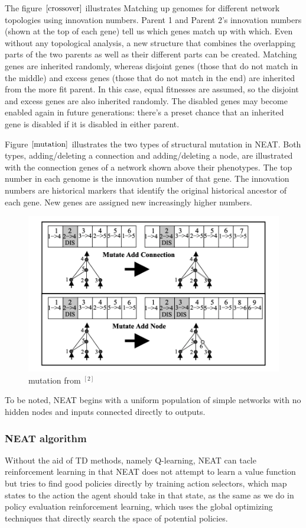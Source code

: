 \documentclass{article}
\begin{document}
The figure $\ref{crossover}$ illustrates Matching up genomes for different network topologies using innovation numbers. 
 Parent 1 and Parent 2's innovation numbers (shown at the top of each gene) tell us which genes match up with which. Even without any topological analysis,
 a new structure that combines the overlapping parts of the two parents as well as their different parts can be created. Matching genes are inherited randomly, whereas disjoint genes (those that do not match in the middle)
  and excess genes (those that do not match in the end) are inherited from the more fit parent. In this case, equal fitnesses are assumed, so the disjoint and excess genes are also inherited randomly. 
  The disabled genes may become enabled again in future generations: there’s a preset chance that an inherited gene is disabled if it is disabled in either parent.

  Figure $\ref{mutation}$ illustrates the two types of structural mutation in NEAT. Both types, adding/deleting a connection and adding/deleting a node, are illustrated with the connection genes of a network shown above their phenotypes. 
  The top number in each genome is the innovation number of that gene. The innovation numbers are historical markers that identify the original historical ancestor of each gene.
   New genes are assigned new increasingly higher numbers.
\begin{figure}[htbp]
    \centering
    \includegraphics[width = .8\textwidth]{mutation}
    \caption{mutation from $^{[2]}$}
    \label{mutation}
  \end{figure}
  To be noted, NEAT begins with a uniform population of simple networks with no hidden nodes and inputs connected directly to outputs.


\subsubsection{NEAT algorithm}
Without the aid of TD methods, namely Q-learning, NEAT can tacle reinforcement learning in that NEAT does not attempt to learn a value function but tries to find good policies directly by training action selectors,
which map states to the action the agent should take in that state, as the same as we do in policy evaluation reinforcement learning, which uses the global optimizing 
techniques that directly search the space of potential policies.
\end{document}
